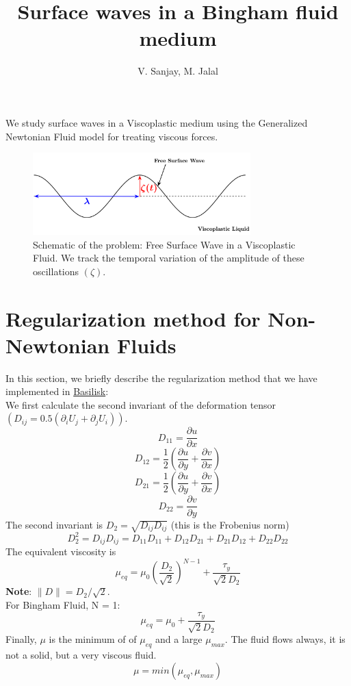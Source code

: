 \documentclass[]{article}
\title{\textbf{Surface waves in a Bingham fluid medium}}
\author{V. Sanjay, M. Jalal}
\date{}
\begin{document}
\maketitle
We study surface waves in a Viscoplastic medium using the Generalized Newtonian Fluid model for treating viscous forces.
\begin{figure}[h]
\begin{center}
 \includegraphics[width=0.75\textwidth]{Schematic}
 \caption{Schematic of the problem: Free Surface Wave in a Viscoplastic Fluid.
 We track the temporal variation of the amplitude of these oscillations $\left(\zeta\right)$.}
 \label{Figure::Schematic}
\end{center}
\end{figure}

\section{Regularization method for Non-Newtonian Fluids}\label{Section::Regularization}
In this section, we briefly describe the regularization method that we have implemented in \href{http://basilisk.fr/}{Basilisk}:\\
We first calculate the second invariant of the deformation tensor $\left(D_{ij} = 0.5\left(\partial_iU_j + \partial_jU_i\right)\right)$.
$$D_{11} = \frac{\partial u}{\partial x}$$
$$D_{12} = \frac{1}{2}\left( \frac{\partial u}{\partial y}+ \frac{\partial v}{\partial x}\right)$$
$$D_{21} = \frac{1}{2}\left( \frac{\partial u}{\partial y}+ \frac{\partial v}{\partial x}\right)$$
$$D_{22} = \frac{\partial v}{\partial y}$$
The second invariant is $D_2=\sqrt{D_{ij}D_{ij}}$ (this is the Frobenius norm)
$$D_2^2= D_{ij}D_{ij}= D_{11}D_{11} + D_{12}D_{21} + D_{21}D_{12} + D_{22}D_{22}$$
The equivalent viscosity is
$$\mu_{eq}= \mu_0\left(\frac{D_2}{\sqrt{2}}\right)^{N-1} + \frac{\tau_y}{\sqrt{2} D_2 }$$
\textbf{Note}: $\|D\| = D_2/\sqrt{2}$.\\
For Bingham Fluid, N = 1:
$$\mu_{eq}= \mu_0 + \frac{\tau_y}{\sqrt{2} D_2 }$$
Finally, $\mu$ is the minimum of of $\mu_{eq}$ and a large $\mu_{max}$. The fluid flows always, it is not a solid, but a very viscous fluid.
$$ \mu = min\left(\mu_{eq}, \mu_{max}\right) $$
\end{document}
